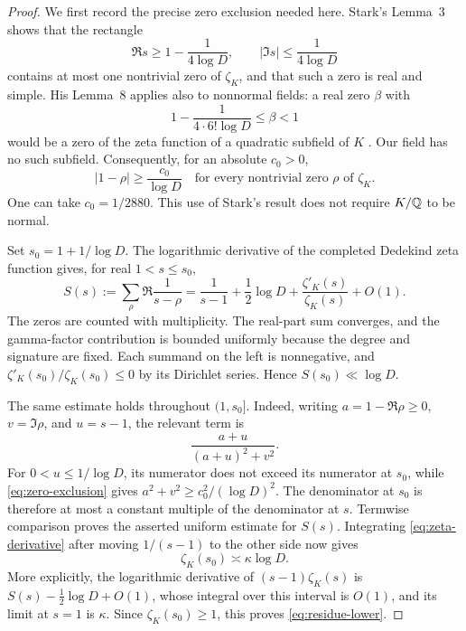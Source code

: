 \begin{proof}
We first record the precise zero exclusion needed here.  Stark's
Lemma~3 shows that the rectangle
\[
 \Re s\ge1-\frac1{4\log D},\qquad
 |\Im s|\le\frac1{4\log D}
\]
contains at most one nontrivial zero of $\zeta_K$, and that such a
zero is real and simple.  His Lemma~8 applies also to nonnormal
fields: a real zero $\beta$ with
\[
 1-\frac1{4\cdot6!\log D}\le\beta<1
\]
would be a zero of the zeta function of a quadratic subfield of $K$
\cite[Lemmas~3 and~8]{Stark1974}.  Our field has no such subfield.
Consequently, for an absolute $c_0>0$,
\begin{equation}
 |1-\rho|\ge \frac{c_0}{\log D}
 \quad\text{for every nontrivial zero $\rho$ of $\zeta_K$}.
                                                        \label{eq:zero-exclusion}
\end{equation}
One can take $c_0=1/2880$.  This use of Stark's result does not require
$K/\mathbb Q$ to be normal.

Set $s_0=1+1/\log D$.  The logarithmic derivative of the completed
Dedekind zeta function gives, for real $1<s\le s_0$,
\begin{equation}
 S(s):=\sum_\rho\Re\frac1{s-\rho}
   =\frac1{s-1}+\frac12\log D
        +\frac{\zeta'_K(s)}{\zeta_K(s)}+O(1).
                                                        \label{eq:zeta-derivative}
\end{equation}
The zeros are counted with multiplicity.  The real-part sum converges,
and the gamma-factor contribution is bounded uniformly because the
degree and signature are fixed.  Each summand on the left is
nonnegative, and $\zeta'_K(s_0)/\zeta_K(s_0)\le0$ by its Dirichlet
series.  Hence $S(s_0)\ll\log D$.

The same estimate holds throughout $(1,s_0]$.  Indeed, writing
$a=1-\Re\rho\ge0$, $v=\Im\rho$, and $u=s-1$, the relevant term is
\[
 \frac{a+u}{(a+u)^2+v^2}.
\]
For $0<u\le1/\log D$, its numerator does not exceed its numerator
at $s_0$, while \eqref{eq:zero-exclusion} gives
$a^2+v^2\ge c_0^2/(\log D)^2$.  The denominator at $s_0$ is
therefore at most a constant multiple of the denominator at $s$.
Termwise comparison proves the asserted uniform estimate for $S(s)$.
Integrating \eqref{eq:zeta-derivative} after moving $1/(s-1)$ to the
other side now gives
\begin{equation}
 \zeta_K(s_0)\asymp\kappa\log D.                 \label{eq:zeta-residue-comparison}
\end{equation}
More explicitly, the logarithmic derivative of
$(s-1)\zeta_K(s)$ is $S(s)-\tfrac12\log D+O(1)$, whose integral
over this interval is $O(1)$, and its limit at $s=1$ is $\kappa$.
Since $\zeta_K(s_0)\ge1$, this proves \eqref{eq:residue-lower}.


\end{proof}
